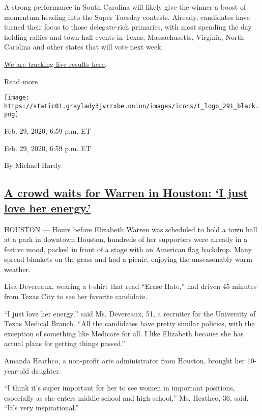 A strong performance in South Carolina will likely give the winner a
boost of momentum heading into the Super Tuesday contests. Already,
candidates have turned their focus to those delegate-rich primaries,
with most spending the day holding rallies and town hall events in
Texas, Massachusetts, Virginia, North Carolina and other states that
will vote next week.

\href{https://www.nytimes3xbfgragh.onion/interactive/2020/02/29/us/elections/results-south-carolina-primary-election.html}{We
are tracking live results here}.

Read more

\texttt{[image: https://static01.graylady3jvrrxbe.onion/images/icons/t\_logo\_291\_black.png]}

Feb. 29, 2020, 6:59 p.m. ET

Feb. 29, 2020, 6:59 p.m. ET

By Michael Hardy

\hypertarget{a-crowd-waits-for-warren-in-houston-i-just-love-her-energy}{%
\subsection{\texorpdfstring{\protect\hyperlink{a-crowd-waits-for-warren-in-houston-i-just-love-her-energy}{A
crowd waits for Warren in Houston: `I just love her
energy.'}}{A crowd waits for Warren in Houston: `I just love her energy.'}}\label{a-crowd-waits-for-warren-in-houston-i-just-love-her-energy}}

HOUSTON --- Hours before Elizabeth Warren was scheduled to hold a town
hall at a park in downtown Houston, hundreds of her supporters were
already in a festive mood, packed in front of a stage with an American
flag backdrop. Many spread blankets on the grass and had a picnic,
enjoying the unseasonably warm weather.

Lisa Devereaux, wearing a t-shirt that read ``Erase Hate,'' had driven
45 minutes from Texas City to see her favorite candidate.

``I just love her energy,'' said Ms. Devereaux, 51, a recruiter for the
University of Texas Medical Branch. ``All the candidates have pretty
similar policies, with the exception of something like Medicare for all.
I like Elizabeth because she has actual plans for getting things
passed.''

Amanda Heathco, a non-profit arts administrator from Houston, brought
her 10-year-old daughter.

``I think it's super important for her to see women in important
positions, especially as she enters middle school and high school,'' Ms.
Heathco, 36, said. ``It's very inspirational.''

